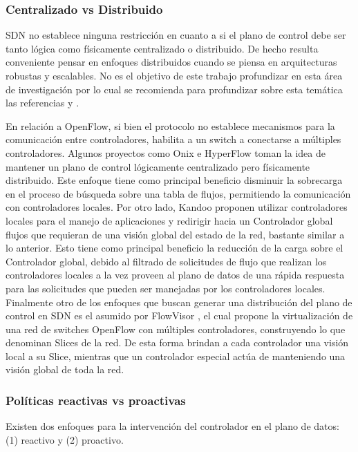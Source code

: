 \subsubsection{Centralizado vs Distribuido}
SDN no establece ninguna restricción en cuanto a si el plano de control debe ser tanto lógica como físicamente centralizado o distribuido. De hecho resulta conveniente pensar en enfoques distribuidos cuando se piensa en arquitecturas robustas y escalables. No es el objetivo de este trabajo profundizar en esta área de investigación por lo cual se recomienda para profundizar sobre esta temática las referencias \cite{heller2012controller} y \cite{levin2012logically}. 

En relación a OpenFlow, si bien el protocolo no establece mecanismos para la comunicación entre controladores, habilita a un switch a conectarse a múltiples controladores. Algunos proyectos como Onix \cite{koponen2014distributed} e HyperFlow \cite{tootoonchian2010hyperflow} toman la idea de mantener un plano de control lógicamente centralizado pero físicamente distribuido. Este enfoque tiene como principal beneficio disminuir la sobrecarga en el proceso de búsqueda sobre una tabla de flujos, permitiendo la comunicación con controladores locales. Por otro lado, Kandoo
 \cite{hassas2012kandoo} proponen utilizar controladores locales para el manejo de aplicaciones y redirigir hacia un Controlador global flujos que requieran de una visión global del estado de la red, bastante similar a lo anterior. Esto tiene como principal beneficio la reducción de la carga sobre el Controlador global, debido al filtrado de solicitudes de flujo que realizan los controladores locales a la vez proveen al plano de datos de una rápida respuesta para las solicitudes que pueden ser manejadas por los controladores locales. Finalmente otro de los enfoques que buscan generar una distribución del plano de control en SDN es el asumido por FlowVisor \cite{sherwood2010carving}, el cual propone la virtualización de una red de switches OpenFlow con múltiples controladores, construyendo lo que denominan Slices de la red. De esta forma brindan a cada controlador una visión local a su Slice, mientras que un controlador especial act\'ua de  manteniendo una visión global de toda la red.

\subsubsection{Políticas reactivas vs proactivas}
Existen dos enfoques para la intervención del controlador en el plano de datos: (1) reactivo y (2) proactivo.

